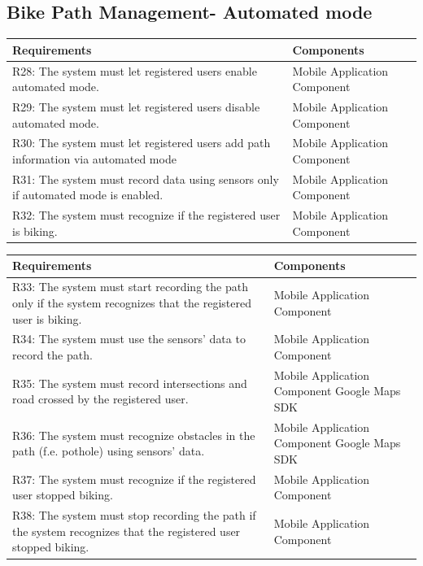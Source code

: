 \subsection{Bike Path Management- Automated mode}
\begin{table}[ht]
\begin{tabular}{|p{9cm}|p{6cm}|}
\hline
\textbf{Requirements}      & \multicolumn{1}{l|}{\textbf{Components}}\\ \hline
R28: The system must let registered users enable automated mode. 
&
Mobile Application Component
\\ \hline
R29: The system must let registered users disable automated mode.  
&
Mobile Application Component
\\ \hline
R30: The system must let registered users add path information via automated mode 
&
Mobile Application Component
\\ \hline
R31: The system must record data using sensors only if automated mode is enabled. 
&
Mobile Application Component
\\ \hline
R32: The system must recognize if the registered user is biking. 
&
Mobile Application Component
\\ \hline
\end{tabular}
\end{table}
\newpage
\begin{table}[ht]
\begin{tabular}{|p{9cm}|p{6cm}|}
\hline
\textbf{Requirements}      & \multicolumn{1}{l|}{\textbf{Components}}\\ \hline
R33: The system must start recording the path only if the system recognizes that the registered user is biking. 
&
Mobile Application Component
\\ \hline
R34: The system must use the sensors’ data to record the path. 
&
Mobile Application Component
\\ \hline
R35: The system must record intersections and road crossed by the registered user.
&
Mobile Application Component
\newline
Google Maps SDK
\\ \hline
R36: The system must recognize obstacles in the path (f.e. pothole) using sensors’ data. 
&
Mobile Application Component
\newline
Google Maps SDK
\\ \hline
R37: The system must recognize if the registered user stopped biking.  
&
Mobile Application Component
\\ \hline
R38: The system must stop recording the path if the system recognizes that the registered user stopped biking. 
&
Mobile Application Component
\\ \hline
\end{tabular}
\end{table}
